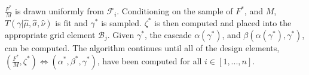 %
$\frac{F^*}{M}$ is drawn uniformly from $\mathcal{F}_i$. Conditioning on the 
sample of $F^*$, and $M$, $T(\gamma|\hat\mu, \hat\sigma, \hat\nu)$ is fit and 
$\gamma^*$ is sampled. $\zeta^*$ is then computed and placed into the appropriate
grid element $\mathcal{B}_j$. Given $\gamma^*$, the cascade $\alpha(\gamma^*)$, 
and $\beta(\alpha(\gamma^*), \gamma^*)$, can be computed. The algorithm 
continues until all of the design elements, $(\frac{F^*}{M}, \zeta^*)\Leftrightarrow(\alpha^*, \beta^*, \gamma^*)$,
have been computed for all $i\in[1,...,n]$.






